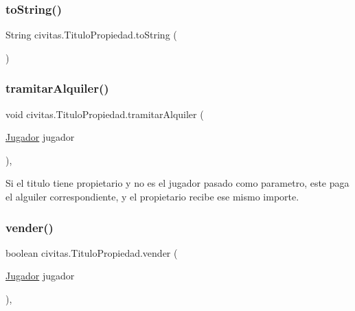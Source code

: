 \mbox{\label{classcivitas_1_1TituloPropiedad_a89e2997e19e157b2cc1df105cdeb1020}} 
\subsubsection{\texorpdfstring{to\+String()}{toString()}}
{\footnotesize\ttfamily String civitas.\+Titulo\+Propiedad.\+to\+String (\begin{DoxyParamCaption}{ }\end{DoxyParamCaption})\hspace{0.3cm}{\ttfamily [inline]}}

\mbox{\label{classcivitas_1_1TituloPropiedad_a1147fd3806f6425bf3b8ed802e670e9f}} 
\subsubsection{\texorpdfstring{tramitar\+Alquiler()}{tramitarAlquiler()}}
{\footnotesize\ttfamily void civitas.\+Titulo\+Propiedad.\+tramitar\+Alquiler (\begin{DoxyParamCaption}\item[{\hyperlink{classcivitas_1_1Jugador}{Jugador}}]{jugador }\end{DoxyParamCaption})\hspace{0.3cm}{\ttfamily [inline]}, {\ttfamily [package]}}

Si el titulo tiene propietario y no es el jugador pasado como parametro, este paga el alguiler correspondiente, y el propietario recibe ese mismo importe. \mbox{\label{classcivitas_1_1TituloPropiedad_aec443566c1a6c671d2f23054efae091e}} 
\subsubsection{\texorpdfstring{vender()}{vender()}}
{\footnotesize\ttfamily boolean civitas.\+Titulo\+Propiedad.\+vender (\begin{DoxyParamCaption}\item[{\hyperlink{classcivitas_1_1Jugador}{Jugador}}]{jugador }\end{DoxyParamCaption})\hspace{0.3cm}{\ttfamily [inline]}, {\ttfamily [package]}}

